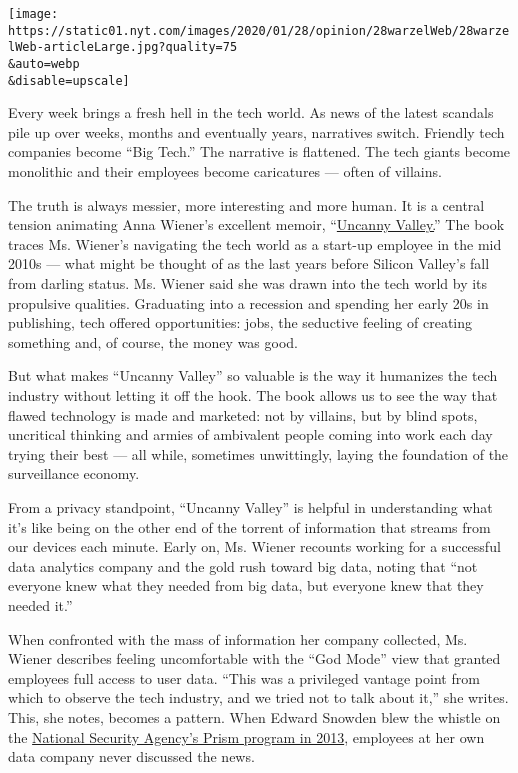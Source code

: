 \texttt{[image: https://static01.nyt.com/images/2020/01/28/opinion/28warzelWeb/28warzelWeb-articleLarge.jpg?quality=75\\\&auto=webp\\\&disable=upscale]}

Every week brings a fresh hell in the tech world. As news of the latest
scandals pile up over weeks, months and eventually years, narratives
switch. Friendly tech companies become ``Big Tech.'' The narrative is
flattened. The tech giants become monolithic and their employees become
caricatures --- often of villains.

The truth is always messier, more interesting and more human. It is a
central tension animating Anna Wiener's excellent memoir,
``\href{https://us.macmillan.com/books/9780374719760}{Uncanny Valley.}''
The book traces Ms. Wiener's navigating the tech world as a start-up
employee in the mid 2010s --- what might be thought of as the last years
before Silicon Valley's fall from darling status. Ms. Wiener said she
was drawn into the tech world by its propulsive qualities. Graduating
into a recession and spending her early 20s in publishing, tech offered
opportunities: jobs, the seductive feeling of creating something and, of
course, the money was good.

But what makes ``Uncanny Valley'' so valuable is the way it humanizes
the tech industry without letting it off the hook. The book allows us to
see the way that flawed technology is made and marketed: not by
villains, but by blind spots, uncritical thinking and armies of
ambivalent people coming into work each day trying their best --- all
while, sometimes unwittingly, laying the foundation of the surveillance
economy.

From a privacy standpoint, ``Uncanny Valley'' is helpful in
understanding what it's like being on the other end of the torrent of
information that streams from our devices each minute. Early on, Ms.
Wiener recounts working for a successful data analytics company and the
gold rush toward big data, noting that ``not everyone knew what they
needed from big data, but everyone knew that they needed it.''

When confronted with the mass of information her company collected, Ms.
Wiener describes feeling uncomfortable with the ``God Mode'' view that
granted employees full access to user data. ``This was a privileged
vantage point from which to observe the tech industry, and we tried not
to talk about it,'' she writes. This, she notes, becomes a pattern. When
Edward Snowden blew the whistle on the
\href{https://www.washingtonpost.com/news/wonk/wp/2013/06/12/heres-everything-we-know-about-prism-to-date/}{National
Security Agency's Prism program in 2013}, employees at her own data
company never discussed the news.

